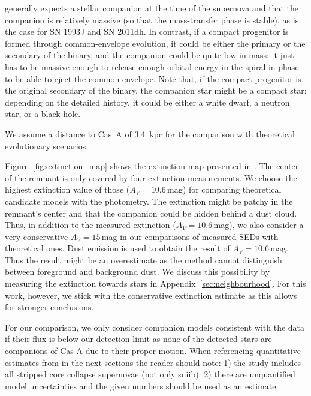 \documentclass{aa}
\begin{document}
generally expects a stellar companion at the time of the supernova and
that the companion is relatively massive (so that the mass-transfer
phase is stable), as is the case for SN 1993J and SN 2011dh. In
contrast, if a compact progenitor is formed through common-envelope
evolution, it could be either the primary or the secondary of the
binary, and the companion could be quite low in mass: it just has to
be massive enough to release enough orbital energy in the spiral-in
phase to be able to eject the common envelope. Note that, if the
compact progenitor is the original secondary of the binary, the
companion star might be a compact star; depending on the detailed
history, it could be either a white dwarf, a neutron star, or a black
hole.

We assume a distance to Cas~A of 3.4~kpc \citep[with an uncertainty of about 10\%;][corroborated by \citealt{2014MNRAS.441.2996A}]{1995ApJ...440..706R} for the comparison with theoretical evolutionary scenarios. 

Figure~\ref{fig:extinction_map} shows the extinction map presented in \citet{2017MNRAS.465.3309D}. The center of the remnant is only covered by four extinction measurements. We choose the highest extinction value of those ($A_V=10.6$\,mag) for comparing theoretical candidate models with the photometry. The extinction might be patchy in the remnant's center and that the companion could be hidden behind a dust cloud. Thus, in addition to the measured extinction ($A_V=10.6$\,mag), we also consider a very conservative $A_V=15$\,mag in our comparisons of measured SEDs with theoretical ones. Dust emission \citep{2017MNRAS.465.3309D} is used to obtain the result of $A_V=10.6$\,mag. Thus the result might be an overestimate as the method cannot distinguish between foreground and background dust. We discuss this possibility by measuring the extinction towards stars in Appendix~\ref{sec:neighbourhood}. For this work, however, we stick with the conservative extinction estimate as this allows for stronger conclusions.

For our comparison, we only consider companion models consistent with the data if their flux is below our detection limit as none of the detected stars are companions of Cas A due to their proper motion. When referencing quantitative estimates from \citet{2017ApJ...842..125Z} in the next sections the reader should note: 1) the study includes all stripped core collapse supernovae (not only \gls{sniib}). 2) there are unquantified model uncertainties and the given numbers should be used as an estimate.
\end{document}
